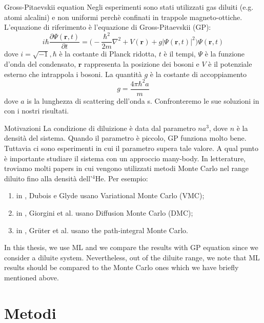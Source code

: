 \documentclass[10pt]{beamer}
\begin{document}
\begin{frame}[fragile]{Gross-Pitaevskii equation}
	Negli esperimenti sono stati utilizzati gas diluiti (e.g. atomi alcalini) e non uniformi perchè confinati in trappole magneto-ottiche. L'equazione di riferimento è l'equazione di Gross-Pitaevskii (GP): 
	\begin{equation*}
	\label{GP}
	i\hbar\frac{\partial \Psi (\mathbf{r},t)}{\partial t}=\bigg(-\frac{\hbar^2}{2m}\nabla^2+V(\mathbf{r})+g|\Psi(\mathbf{r},t)|^2\bigg)\Psi(\mathbf{r},t)
	\end{equation*}
	dove $i=\sqrt{-1}, \hbar$ è la costante di Planck ridotta, $t$ è il tempi, $\Psi$ è la funzione d'onda del condensato, $\mathbf{r}$ rappresenta la posizione dei bosoni e $V$ è il potenziale esterno che intrappola i bosoni. La quantità $g$ è la costante di accoppiamento 
	\begin{equation*}
	g=\frac{4\pi\hbar^2a}{m}
	\end{equation*}
	dove $a$ is la lunghezza di scattering dell'onda s. Confronteremo le sue soluzioni in \cite{DalfString} con i nostri risultati. 
\end{frame}

\begin{frame}[fragile]{Motivazioni}
	La condizione di diluizione è data dal parametro $na^3$, dove $n$ è la densità del sistema.
	Quando il parametro è piccolo, GP funziona molto bene. Tuttavia ci sono esperimenti in cui il parametro supera tale valore. A qual punto è importante studiare il sistema con un approccio many-body. In letterature, troviamo molti papers in cui vengono utilizzati metodi Monte Carlo nel range diluito fino alla densità dell'$^4$He. Per esempio:
	\begin{enumerate}
		\item in \cite{vmcarticle}, Dubois e Glyde usano Variational Monte Carlo (VMC);
		\item in \cite{Giorgini}, Giorgini et al. usano Diffusion Monte Carlo (DMC);
		\item in \cite{Gruter}, Gr\"{u}ter et al. usano the path-integral Monte Carlo.
	\end{enumerate}  
	In this thesis, we use ML and we compare the results with GP equation since we consider a diluite system. Nevertheless, out of the diluite range, we note that ML results should be compared to the Monte Carlo ones which we have briefly mentioned above. 
\end{frame}


\section{Metodi}
\end{document}
